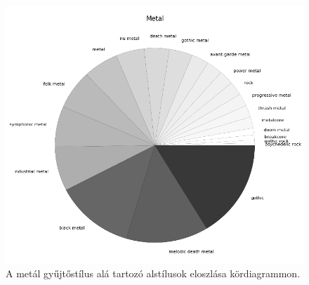 \begin{figure}[p]
    \includegraphics{src/images/metal_dist.png}
    \caption{A metál gyűjtőstílus alá tartozó alstílusok eloszlása kördiagrammon.}
\end{figure}

